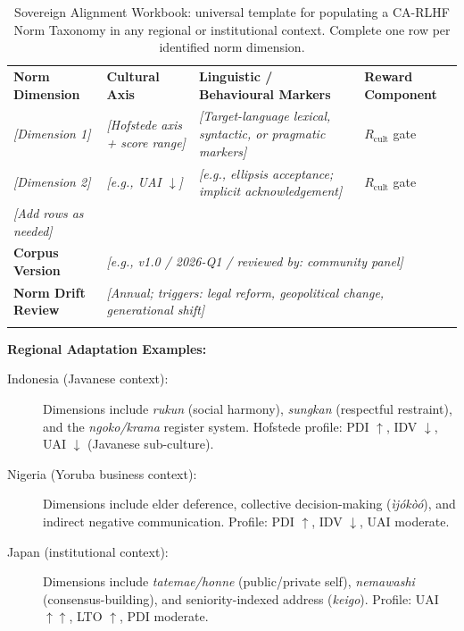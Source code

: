 \begin{table}[ht]
\centering
\caption{Sovereign Alignment Workbook: universal template for populating a CA-RLHF Norm Taxonomy in any regional or institutional context. Complete one row per identified norm dimension.}
\label{tab:sovereign_workbook}
\begin{tabular}{p{2.8cm} p{2.5cm} p{4.0cm} p{2.0cm}}
\hline\noalign{\smallskip}
\textbf{Norm Dimension} &
\textbf{Cultural Axis} &
\textbf{Linguistic / Behavioural Markers} &
\textbf{Reward Component} \\
\noalign{\smallskip}\svhline\noalign{\smallskip}

\textit{[Dimension 1]}
  & \textit{[Hofstede axis + score range]}
  & \textit{[Target-language lexical, syntactic, or pragmatic markers]}
  & $R_\mathrm{cult}$ gate \\[5pt]

\textit{[Dimension 2]}
  & \textit{[e.g., UAI $\downarrow$]}
  & \textit{[e.g., ellipsis acceptance; implicit acknowledgement]}
  & $R_\mathrm{cult}$ gate \\[5pt]

\textit{[Add rows as needed]}
  & & & \\[5pt]

\textbf{Corpus Version}
  & \multicolumn{3}{p{8.5cm}}{\textit{[e.g., v1.0 / 2026-Q1 / reviewed by: community panel]}} \\[5pt]

\textbf{Norm Drift Review}
  & \multicolumn{3}{p{8.5cm}}{\textit{[Annual; triggers: legal reform, geopolitical change, generational shift]}} \\

\noalign{\smallskip}\hline\noalign{\smallskip}
\end{tabular}
\end{table}

\begin{svgraybox}
\textbf{Regional Adaptation Examples:}
\begin{description}
  \item[Indonesia (Javanese context):] Dimensions include \textit{rukun} (social harmony), \textit{sungkan} (respectful restraint), and the \textit{ngoko/krama} register system. Hofstede profile: PDI $\uparrow$, IDV $\downarrow$, UAI $\downarrow$ (Javanese sub-culture).
  \item[Nigeria (Yoruba business context):] Dimensions include elder deference, collective decision-making (\textit{\`{i}j\'{o}k\`{o}\'{o}}), and indirect negative communication. Profile: PDI $\uparrow$, IDV $\downarrow$, UAI moderate.
  \item[Japan (institutional context):] Dimensions include \textit{tatemae/honne} (public/private self), \textit{nemawashi} (consensus-building), and seniority-indexed address (\textit{keigo}). Profile: UAI $\uparrow\uparrow$, LTO $\uparrow$, PDI moderate.
\end{description}
\end{svgraybox}

